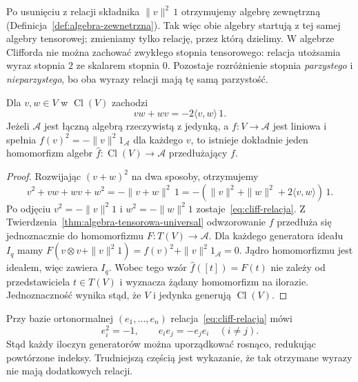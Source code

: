 Po usunięciu z relacji składnika $\|v\|^2\,1$
otrzymujemy algebrę zewnętrzną
(Definicja~\ref{def:algebra-zewnetrzna}).
Tak więc obie algebry startują z tej samej algebry
tensorowej; zmieniamy tylko relację, przez którą
dzielimy. W algebrze Clifforda nie można zachować
zwykłego stopnia tensorowego: relacja utożsamia
wyraz stopnia $2$ ze skalarem stopnia $0$.
Pozostaje rozróżnienie stopnia \emph{parzystego}
i \emph{nieparzystego}, bo oba wyrazy relacji
mają tę samą parzystość.

\begin{twierdzenie}
\label{thm:cliff-relacje}
Dla $v,w\in V$ w $\operatorname{Cl}(V)$ zachodzi
\begin{equation}\label{eq:cliff-relacja}
 vw+wv=-2\langle v,w\rangle\,1.
\end{equation}
Jeżeli $\mathcal A$ jest łączną algebrą rzeczywistą
z jedynką, a $f:V\to\mathcal A$ jest liniowa i spełnia
$f(v)^2=-\|v\|^2 1_{\mathcal A}$ dla każdego $v$,
to istnieje dokładnie jeden homomorfizm algebr
$\widehat f:\operatorname{Cl}(V)\to\mathcal A$
przedłużający $f$.
\end{twierdzenie}
\begin{proof}
Rozwijając $(v+w)^2$ na dwa sposoby, otrzymujemy
\[
 v^2+vw+wv+w^2=-\|v+w\|^2\,1
  =-(\|v\|^2+\|w\|^2+2\langle v,w\rangle)\,1.
\]
Po odjęciu $v^2=-\|v\|^2 1$ i
$w^2=-\|w\|^2 1$ zostaje~\eqref{eq:cliff-relacja}.
Z Twierdzenia~\ref{thm:algebra-tensorowa-universal}
odwzorowanie $f$ przedłuża się jednoznacznie do homomorfizmu
$F:T(V)\to\mathcal A$. Dla każdego generatora ideału
$I_q$ mamy
$F(v\otimes v+\|v\|^2 1)
 =f(v)^2+\|v\|^2 1_{\mathcal A}=0$.
Jądro homomorfizmu jest ideałem, więc zawiera $I_q$.
Wobec tego wzór $\widehat f([t])=F(t)$
nie zależy od przedstawiciela $t\in T(V)$
i wyznacza żądany homomorfizm na ilorazie.
Jednoznaczność wynika stąd, że $V$ i jedynka
generują $\operatorname{Cl}(V)$.
\end{proof}

Przy bazie ortonormalnej $(e_1,\ldots,e_n)$
relacja~\eqref{eq:cliff-relacja} mówi
\begin{equation}\label{eq:cliff-orto}
 e_i^2=-1,\qquad e_ie_j=-e_je_i\quad(i\ne j).
\end{equation}
Stąd każdy iloczyn generatorów można uporządkować
rosnąco, redukując powtórzone indeksy.
Trudniejszą częścią jest wykazanie, że tak otrzymane
wyrazy nie mają dodatkowych relacji.

